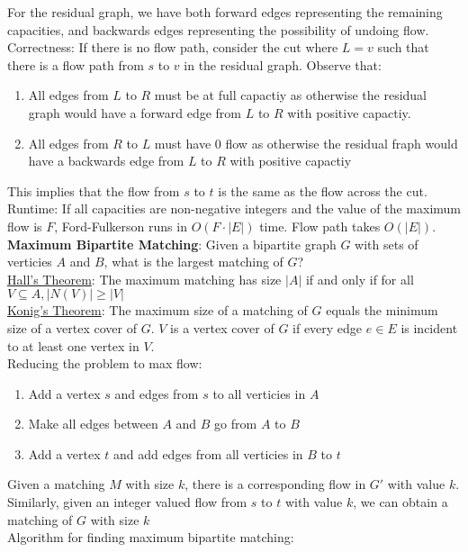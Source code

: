 \documentclass{article}
\begin{document}
For the residual graph, we have both forward edges representing the remaining capacities, and backwards edges representing the possibility of undoing flow. \\[0.5ex]
Correctness: If there is no flow path, consider the cut where $L = v$ such that there is a flow path from $s$ to $v$ in the residual graph. Observe that: 
\begin{enumerate}
    \item All edges from $L$ to $R$ must be at full capactiy as otherwise the residual graph would have a forward edge from $L$ to $R$ with positive capactiy. 
    \item All edges from $R$ to $L$ must have 0 flow as otherwise the residual fraph would have a backwards edge from $L$ to $R$ with positive capactiy 
\end{enumerate}
This implies that the flow from $s$ to $t$ is the same as the flow across the cut. \\[0.5ex]
Runtime: If all capacities are non-negative integers and the value of the maximum flow is $F$, Ford-Fulkerson runs in $O(F \cdot |E|)$ time. Flow path takes $O(|E|)$. \\[1.0ex]
\textbf{Maximum Bipartite Matching}: Given a bipartite graph $G$ with sets of verticies $A$ and $B$, what is the largest matching of $G$? \\
\underline{Hall's Theorem}: The maximum matching has size $|A|$ if and only if for all $V \subseteq A, |N(V)| \geq |V|$ \\[0.5ex]
\underline{Konig's Theorem}: The maximum size of a matching of $G$ equals the minimum size of a vertex cover of $G$. $V$ is a vertex cover of $G$ if every edge $e \in E$ is incident to at least one vertex in $V$. \\[0.5ex]
Reducing the problem to max flow:
\begin{enumerate}
    \item Add a vertex $s$ and edges from $s$ to all verticies in $A$
    \item Make all edges between $A$ and $B$ go from $A$ to $B$
    \item Add a vertex $t$ and add edges from all verticies in $B$ to $t$
\end{enumerate}
Given a matching $M$ with size $k$, there is a corresponding flow in $G'$ with value $k$. Similarly, given an integer valued flow from $s$ to $t$ with value $k$, we can obtain a matching of $G$ with size $k$ \\
Algorithm for finding maximum bipartite matching: 
\end{document}
